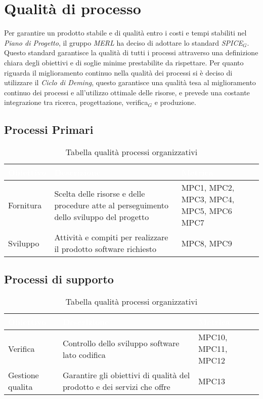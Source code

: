 \chapter{Qualità di processo}
Per garantire un prodotto stabile e di qualità entro i costi e tempi stabiliti nel \textit{Piano di Progetto}, il gruppo \textit{MERL} ha deciso di adottare lo standard \textit{SPICE}$_G$. Questo standard garantisce la qualità di tutti i processi attraverso una definizione chiara degli obiettivi e di soglie minime prestabilite da rispettare.
Per quanto riguarda il miglioramento continuo nella qualità dei processi si è deciso di utilizzare il \textit{Ciclo di Deming}, questo garantisce una qualità tesa al miglioramento continuo dei processi e all'utilizzo ottimale delle risorse, e prevede una costante integrazione tra ricerca, progettazione, verifica$_G$ e produzione.

\section{Processi Primari}
\begin{table}[H]
  \renewcommand{\arraystretch}{1.25}
  \begin{tabular}{|p{2.5cm}|p{8cm}|p{3cm}|} \hline
    \rowcolor[HTML]{036400}
    \textcolor{white}{\textbf{Obiettivo}} & \textcolor{white}{\textbf{Descrizione}} & \textcolor{white}{\textbf{Metrica}}  \\ \hline
    \rowcolor[HTML]{EFEFEF}
    Fornitura & Scelta delle risorse e delle procedure atte al perseguimento dello sviluppo del progetto & MPC1, MPC2, \newline MPC3, MPC4, \newline MPC5, MPC6 \newline MPC7     \\ \hline
    \rowcolor[HTML]{C0C0C0}
    Sviluppo & Attività e compiti per realizzare il prodotto software richiesto & MPC8, MPC9 \\ \hline
  \end{tabular}
  \caption{Tabella qualità processi organizzativi}
\end{table}


\section{Processi di supporto}
\begin{table}[H]
  \renewcommand{\arraystretch}{1.25}
  \begin{tabular}{|p{2.5cm}|p{8cm}|p{1.7cm}|} \hline
    \rowcolor[HTML]{036400}
    \textcolor{white}{\textbf{Obiettivo}} & \textcolor{white}{\textbf{Descrizione}} & \textcolor{white}{\textbf{Metrica}}  \\ \hline
    \rowcolor[HTML]{EFEFEF}
    Verifica & Controllo dello sviluppo software lato codifica & MPC10, MPC11, MPC12  \\ \hline
    \rowcolor[HTML]{C0C0C0}
    Gestione qualita & Garantire gli obiettivi di qualità del prodotto e dei servizi che offre & MPC13  \\ \hline
  \end{tabular}
  \caption{Tabella qualità processi organizzativi}
\end{table}


